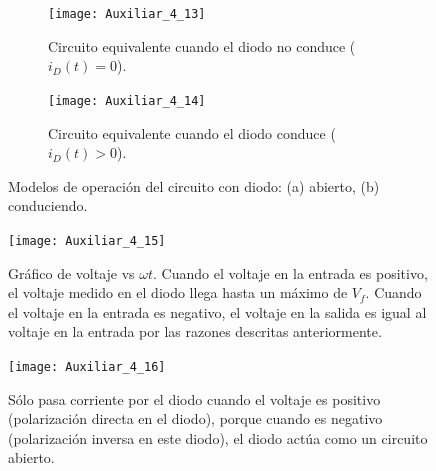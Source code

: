 \documentclass[
  11pt,
  letterpaper,
   addpoints,
   answers
  ]{exam}
\begin{document}
\begin{questions}
\begin{solution}
\begin{figure}[H]
  \centering
  \begin{subfigure}[b]{0.48\textwidth}
    \centering
    \texttt{[image: Auxiliar\_4\_13]}
    \caption{Circuito equivalente cuando el diodo no conduce ($i_D(t) = 0$).}
    \label{fig:diodo-abierto}
  \end{subfigure}\hfill
  \begin{subfigure}[b]{0.48\textwidth}
    \centering
    \texttt{[image: Auxiliar\_4\_14]}
    \caption{Circuito equivalente cuando el diodo conduce ($i_D(t) > 0$).}
    \label{fig:diodo-conduce}
  \end{subfigure}
  \caption{Modelos de operación del circuito con diodo: (a) abierto, (b) conduciendo.}
  \label{fig:diodo-operacion-casos}
\end{figure}
\begin{figure}[H]
    \centering
    \texttt{[image: Auxiliar\_4\_15]}
  \caption{Gráfico de voltaje vs $\omega t$. Cuando el voltaje en la entrada es positivo, el voltaje medido en el diodo llega hasta un máximo de $V_f$. Cuando el voltaje en la entrada es negativo, el voltaje en la salida es igual al voltaje en la entrada por las razones descritas anteriormente.}
    \label{fig:voltaje-corriente-diodo}
\end{figure}
\begin{figure}[H]
    \centering
    \texttt{[image: Auxiliar\_4\_16]}
  \caption{Sólo pasa corriente por el diodo cuando el voltaje es positivo (polarización directa en el diodo), porque cuando es negativo (polarización inversa en este diodo), el diodo actúa como un circuito abierto.}
    \label{fig:voltaje-corriente-diodo-detalle}
\end{figure}
\end{solution}


\end{questions}
\end{document}
